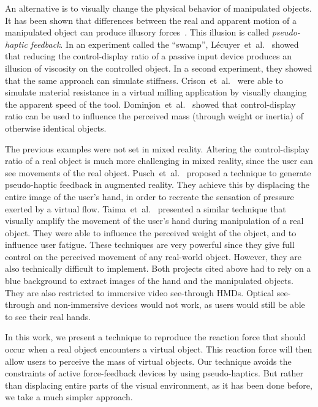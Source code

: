 \documentclass{vgtc}
\begin{document}
An alternative is to visually change the physical behavior of manipulated objects. It has been shown that differences between the real and apparent motion of a manipulated object can produce illusory forces~\cite{lecuyer09}. This illusion is called \emph{pseudo-haptic feedback}. In an experiment called the ``swamp'', Lécuyer~et~al.~\cite{lecuyer00} showed that reducing the control-display ratio of a passive input device produces an illusion of viscosity on the controlled object. In a second experiment, they showed that the same approach can simulate stiffness. Crison~et~al.~\cite{crison04} were able to simulate material resistance in a virtual milling application by visually changing the apparent speed of the tool. Dominjon~et~al.~\cite{dominjon05} showed that control-display ratio can be used to influence the perceived mass (through weight or inertia) of otherwise identical \mbox{objects}.

The previous examples were not set in mixed reality. Altering the control-display ratio of a real object is much more challenging in mixed reality, since the user can see movements of the real object. Pusch~et~al.~\cite{pusch08} proposed a technique to generate pseudo-haptic feedback in augmented reality. They achieve this by displacing the entire image of the user's hand, in order to recreate the sensation of pressure exerted by a virtual flow. Taima~et~al.~\cite{taima14} presented a similar technique that visually amplify the movement of the user's hand during manipulation of a real object. They were able to influence the perceived weight of the object, and to influence user fatigue. These techniques are very powerful since they give full control on the perceived movement of any real-world object. However, they are also technically difficult to implement. Both projects cited above had to rely on a blue background to extract images of the hand and the manipulated objects. They are also restricted to immersive video see-through HMDs. Optical see-through and non-immersive devices would not work, as users would still be able to see their real hands.

In this work, we present a technique to reproduce the reaction force that should occur when a real object encounters a virtual object. This reaction force will then allow users to perceive the mass of virtual objects. Our technique avoids the constraints of active force-feedback devices by using pseudo-haptics. But rather than displacing entire parts of the visual environment, as it has been done before, we take a much simpler approach.
\end{document}

